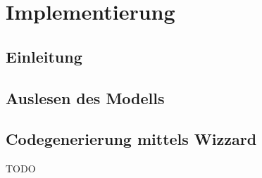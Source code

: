 \chapter{Implementierung} \label{chapter:thevetestcase}
\section{Einleitung}
\section{Auslesen des Modells}
\section{Codegenerierung mittels Wizzard}

TODO